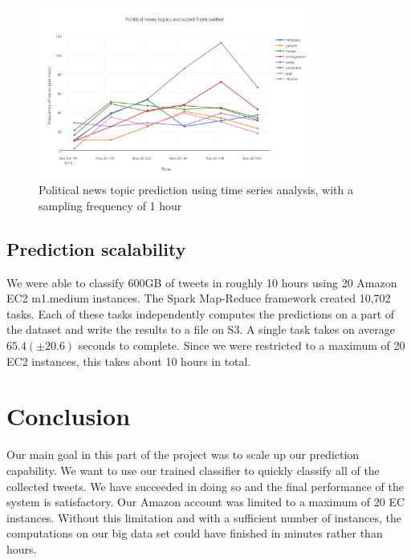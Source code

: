 \documentclass{llncs}
\begin{document}
\begin{figure}
	\centering
	\includegraphics[width=0.8\textwidth]{images/political_news_topics_extracted_from_twitter.png} 
	\caption{Political news topic prediction using time series analysis, with a sampling frequency of 1 hour}
	\label{fig:Political news topic prediction using time series analysis, with a sampling frequency of 1 hour}
\end{figure}

\subsection{Prediction scalability}

We were able to classify 600GB of tweets in roughly 10 hours using 20 Amazon EC2 m1.medium instances. The Spark Map-Reduce framework created 10,702 tasks. Each of these tasks independently computes the predictions on a part of the dataset and write the results to a file on S3. A single task takes on average $65.4 (\pm 20.6)$ seconds to complete. Since we were restricted to a maximum of 20 EC2 instances, this takes about 10 hours in total.

\section{Conclusion}
Our main goal in this part of the project was to scale up our prediction capability. We want to use our trained classifier to quickly classify all of the collected tweets. We have succeeded in doing so and the final performance of the system is satisfactory. Our Amazon account was limited to a maximum of 20 EC instances. Without this limitation and with a sufficient number of instances, the computations on our big data set could have finished in minutes rather than hours.



\end{document}

